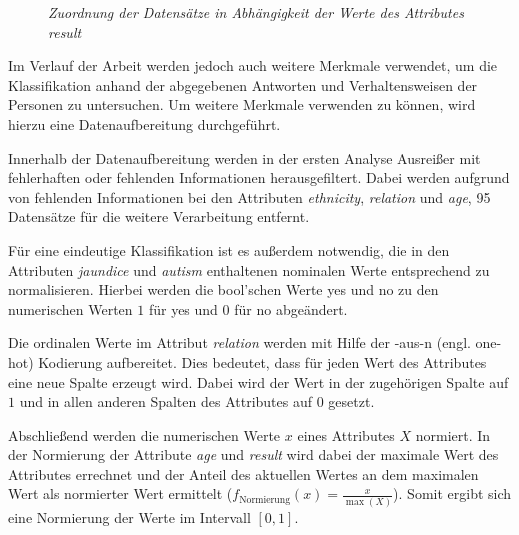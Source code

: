 \begin{figure}[h!]
\centering

\caption{\em Zuordnung der Datensätze in Abhängigkeit der Werte des Attributes \glqq \textit{result}\grqq}
\label{fig:result_classification}
\end{figure}

Im Verlauf der Arbeit werden jedoch auch weitere Merkmale verwendet, um die Klassifikation anhand der abgegebenen Antworten und Verhaltensweisen der Personen zu untersuchen. Um weitere Merkmale verwenden zu können, wird hierzu eine Datenaufbereitung durchgeführt.

Innerhalb der Datenaufbereitung werden in der ersten Analyse Ausreißer mit fehlerhaften oder fehlenden Informationen herausgefiltert. Dabei werden aufgrund von fehlenden Informationen bei den Attributen \textit{ethnicity}, \textit{relation} und \textit{age}, 95 Datensätze für die weitere Verarbeitung entfernt.

Für eine eindeutige Klassifikation ist es außerdem notwendig, die in den Attributen \textit{jaundice} und \textit{autism} enthaltenen nominalen Werte entsprechend zu normalisieren. Hierbei werden die bool'schen Werte \glqq yes\grqq{} und \glqq no\grqq{} zu den numerischen Werten $1$ für \glqq yes\grqq{} und $0$ für \glqq no\grqq{} abgeändert. 

Die ordinalen Werte im Attribut \textit{relation} werden mit Hilfe der -aus-n\grqq{} (engl. \glqq one-hot\grqq) Kodierung aufbereitet. Dies bedeutet, dass für jeden Wert des Attributes eine neue Spalte erzeugt wird. Dabei wird der Wert in der zugehörigen Spalte auf $1$ und in allen anderen Spalten des Attributes auf $0$ gesetzt. %

Abschließend werden die numerischen Werte $x$ eines Attributes $X$ normiert. In der Normierung der Attribute \textit{age} und \textit{result} wird dabei der maximale Wert des Attributes errechnet und der Anteil des aktuellen Wertes an dem maximalen Wert als normierter Wert ermittelt ($f_{\text{Normierung}}(x) = \frac{x}{\max(X)}$). Somit ergibt sich eine Normierung der Werte im Intervall $[0,1]$.

